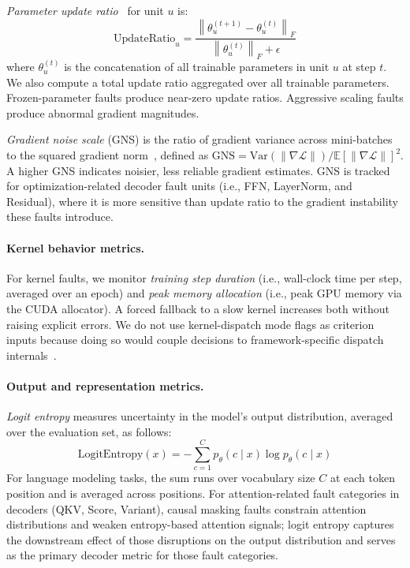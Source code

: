 \emph{Parameter update ratio}~\citep{wortsman2024small} for unit $u$ is:
\begin{equation}
\mathrm{UpdateRatio}_u = \frac{\left\|\theta_u^{(t+1)} - \theta_u^{(t)}\right\|_F}{\left\|\theta_u^{(t)}\right\|_F + \epsilon}
\label{eq:update-ratio}
\end{equation}
where $\theta_u^{(t)}$ is the concatenation of all trainable parameters in unit $u$ at step $t$. We also compute a total update ratio aggregated over all trainable parameters. Frozen-parameter faults produce near-zero update ratios. Aggressive scaling faults produce abnormal gradient magnitudes.

\emph{Gradient noise scale} (GNS) is the ratio of gradient variance across mini-batches to the squared gradient norm~\citep{mccandlish2018empirical}, defined as $\text{GNS} = \text{Var}(\|\nabla \mathcal{L}\|) / \mathbb{E}[\|\nabla \mathcal{L}\|]^2$. A higher GNS indicates noisier, less reliable gradient estimates. GNS is tracked for optimization-related decoder fault units (i.e., FFN, LayerNorm, and Residual), where it is more sensitive than update ratio to the gradient instability these faults introduce.

\paragraph{Kernel behavior metrics.}
For kernel faults, we monitor \emph{training step duration} (i.e., wall-clock time per step, averaged over an epoch) and \emph{peak memory allocation} (i.e., peak GPU memory via the CUDA allocator). A forced fallback to a slow kernel increases both without raising explicit errors. We do not use kernel-dispatch mode flags as criterion inputs because doing so would couple decisions to framework-specific dispatch internals~\citep{dao2022flashattention}.

\paragraph{Output and representation metrics.}
\emph{Logit entropy} measures uncertainty in the model's output distribution, averaged over the evaluation set, as follows:
\begin{equation}
\mathrm{LogitEntropy}(x) = -\sum_{c=1}^{C} p_\theta(c \mid x) \log p_\theta(c \mid x)
\label{eq:logit-entropy}
\end{equation}
For language modeling tasks, the sum runs over vocabulary size $C$ at each token position and is averaged across positions. For attention-related fault categories in decoders (QKV, Score, Variant), causal masking faults constrain attention distributions and weaken entropy-based attention signals; logit entropy captures the downstream effect of those disruptions on the output distribution and serves as the primary decoder metric for those fault categories.

